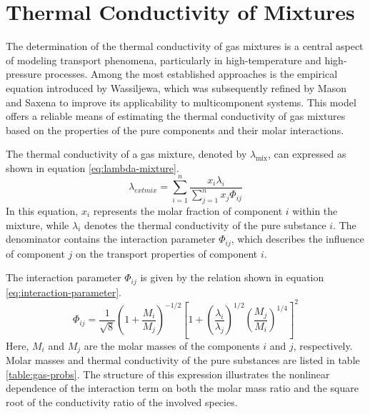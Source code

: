 \section{Thermal Conductivity of Mixtures}
The determination of the thermal conductivity of gas mixtures is a central aspect of modeling
transport phenomena, particularly in high-temperature and high-pressure processes. Among the
most established approaches is the empirical equation introduced by Wassiljewa, which was
subsequently refined by Mason and Saxena to improve its applicability to multicomponent systems.
This model offers a reliable means of estimating the thermal conductivity of gas mixtures based
on the properties of the pure components and their molar interactions.

The thermal conductivity of a gas mixture, denoted by \(\lambda_{\text{mix}}\), can expressed as
shown in equation \ref{eq:lambda-mixture}.
\begin{equation}\label{eq:lambda-mixture}\lambda_{   ext{mix}} = \sum_{i=1}^{n} \frac{x_i \lambda_i}{\sum_{j=1}^{n} x_j \Phi_{ij}}\end{equation}
In this equation, \(x_i\) represents the molar fraction of component \(i\) within the mixture,
while \(\lambda_i\) denotes the thermal conductivity of the pure substance \(i\). The denominator
contains the interaction parameter \(\Phi_{ij}\), which describes the influence of component
\(j\) on the transport properties of component \(i\).

The interaction parameter \(\Phi_{ij}\) is given by the relation shown in equation \ref{eq:interaction-parameter}.
\begin{equation}\label{eq:interaction-parameter}\Phi_{ij} = \frac{1}{\sqrt{8}} \left(1 + \frac{M_i}{M_j} \right)^{-1/2} \left[ 1 + \left( \frac{\lambda_i}{\lambda_j} \right)^{1/2} \left( \frac{M_j}{M_i} \right)^{1/4} \right]^2\end{equation}
Here, \(M_i\) and \(M_j\) are the molar masses of the components \(i\) and \(j\), respectively.
Molar masses and thermal conductivity of the pure substances are listed in table \ref{table:gas-probs}.
The structure of this expression illustrates the nonlinear dependence of the interaction term on
both the molar mass ratio and the square root of the conductivity ratio of the involved species.

